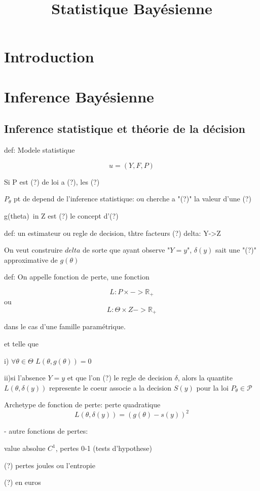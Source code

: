 \documentclass{book}
\title{Statistique Bay\'esienne}
\begin{document}
\maketitle

\tableofcontents
\chapter{Introduction}
\chapter{Inference Bay\'esienne}
\section{Inference statistique et th\'eorie de la d\'ecision}
def: Modele statistique

\begin{equation}
u = (Y,F,P)
\end{equation}
	
Si P est (?) de loi a (?), les (?) 

$P_\theta$
pt de depend de l'inference statistique:
ou cherche a "(?)" la valeur d'une (?)

g(theta)\ in Z est (?) le concept d'(?)

def: un estimateur ou regle de decision, thtre facteurs (?)
delta: Y->Z

On veut construire $delta$ de sorte que ayant observe "$Y=y$", $\delta (y)$ sait une "(?)" approximative de $g(\theta)$

def: On appelle fonction de perte, une fonction 

\begin{equation}
	L: P\times -> \mathbb{R}_+
\end{equation}
ou
\begin{equation}
	L:\Theta\times Z -> \mathbb{R}_+
\end{equation}

dans le cas d'une famille paramétrique.

et telle que

i) $\forall \theta \in \Theta$
$L(\theta,g(\theta)) = 0$

ii)si l'absence $Y=y$ et que l'on (?) le regle de decision $\delta$, alors la quantite $L(\theta,\delta(y))$ represente le coeur associe a la decision
$S(y)$ pour la loi $P_\theta \in \mathscr{P}$

Archetype de fonction de perte: perte quadratique
\begin{equation}
	L(\theta, \delta(y)) = (g(\theta) - s(y))^2
\end{equation}

- autre fonctions de pertes:

value absolue $C^1$, pertes 0-1 (tests d'hypothese)

(?) pertes joules ou l'entropie

(?) en euros
\end{document}
